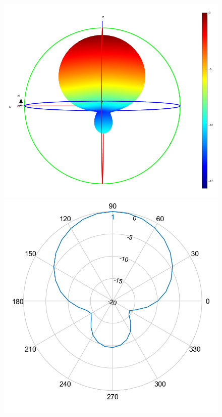 \begin{figure}[!htb]
  \includegraphics[width=\linewidth]{../images/pattern2/pattern.png}
\endminipage\hfill
{}
  \includegraphics[width=\linewidth]{../images/pattern2/ep.png} 
\endminipage\hfill
{}%

\end{figure}
